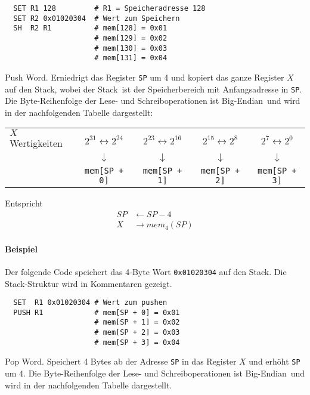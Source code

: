\begin{lstlisting}
  SET R1 128         # R1 = Speicheradresse 128
  SET R2 0x01020304  # Wert zum Speichern
  SH  R2 R1          # mem[128] = 0x01
                     # mem[129] = 0x02
                     # mem[130] = 0x03
                     # mem[131] = 0x04
\end{lstlisting}




\glqq Push Word\grqq.
Erniedrigt das Register \texttt{SP} um 4 und kopiert das ganze Register $X$ auf
den Stack, wobei der \glqq Stack\grqq\ ist der Speicherbereich mit
Anfangsadresse in \texttt{SP}.
Die Byte-Reihenfolge der Lese- und Schreiboperationen ist \glqq Big-Endian\grqq\
und wird in der nachfolgenden Tabelle dargestellt:
\begin{center}
\begin{tabular}{l|cccc}
  \toprule
  $X$  Wertigkeiten &
  $2^{31} \leftrightarrow 2^{24}$ &
  $2^{23} \leftrightarrow 2^{16}$ &
  $2^{15} \leftrightarrow 2^{8}$  &
  $2^{7}  \leftrightarrow 2^{0}$ 
  \\
  &
  $\downarrow$ & $\downarrow$ & $\downarrow$ & $\downarrow$ 
  \\
  \text{Stack-Bereich} &
  \texttt{mem[SP + 0]} &
  \texttt{mem[SP + 1]} &
  \texttt{mem[SP + 2]} &
  \texttt{mem[SP + 3]}
  \\\bottomrule
\end{tabular}
\end{center}


Entspricht
\begin{align*}
  SP & \gets SP - 4    \\
  X  & \to mem_{4}(SP)
\end{align*}

\paragraph{Beispiel}
Der folgende Code speichert das 4-Byte Wort \texttt{0x01020304} auf den Stack.
Die Stack-Struktur wird in Kommentaren gezeigt.
\begin{lstlisting}
  SET  R1 0x01020304 # Wert zum pushen
  PUSH R1            # mem[SP + 0] = 0x01
                     # mem[SP + 1] = 0x02
                     # mem[SP + 2] = 0x03
                     # mem[SP + 3] = 0x04
\end{lstlisting}




\glqq Pop Word\grqq.
Speichert 4 Bytes ab der Adresse \texttt{SP} in das Register $X$ und erhöht
\texttt{SP} um 4.
Die Byte-Reihenfolge der Lese- und Schreiboperationen ist \glqq Big-Endian\grqq\
und wird in der nachfolgenden Tabelle dargestellt.

